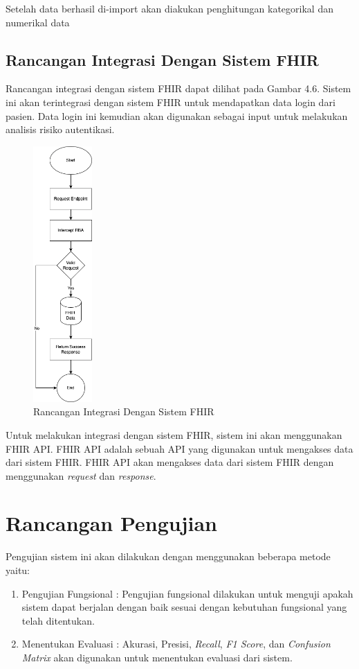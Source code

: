 Setelah data berhasil di-import akan diakukan penghitungan kategorikal dan numerikal data 

\subsection{Rancangan Integrasi Dengan Sistem FHIR}
Rancangan integrasi dengan sistem FHIR dapat dilihat pada Gambar 4.6. Sistem ini akan terintegrasi dengan sistem FHIR untuk mendapatkan data login dari pasien. Data login ini kemudian akan digunakan sebagai input untuk melakukan analisis risiko autentikasi.
\begin{figure}[H]
    \centering
    \includegraphics[width=0.2\textwidth]{contents/chapter-4/fhir-rba.drawio.png}
    \caption{Rancangan Integrasi Dengan Sistem FHIR}
    \label{fig:integrasi}
\end{figure}

Untuk melakukan integrasi dengan sistem FHIR, sistem ini akan menggunakan FHIR API. FHIR API adalah sebuah API yang digunakan untuk mengakses data dari sistem FHIR. FHIR API akan mengakses data dari sistem FHIR dengan menggunakan \textit{request} dan \textit{response}.

\section{Rancangan Pengujian}
Pengujian sistem ini akan dilakukan dengan menggunakan beberapa metode yaitu:
\begin{enumerate}
    \item Pengujian Fungsional : Pengujian fungsional dilakukan untuk menguji apakah sistem dapat berjalan dengan baik sesuai dengan kebutuhan fungsional yang telah ditentukan.
    \item Menentukan Evaluasi : Akurasi, Presisi, \textit{Recall}, \textit{F1 Score}, dan \textit{Confusion Matrix} akan digunakan untuk menentukan evaluasi dari sistem.
\end{enumerate}
